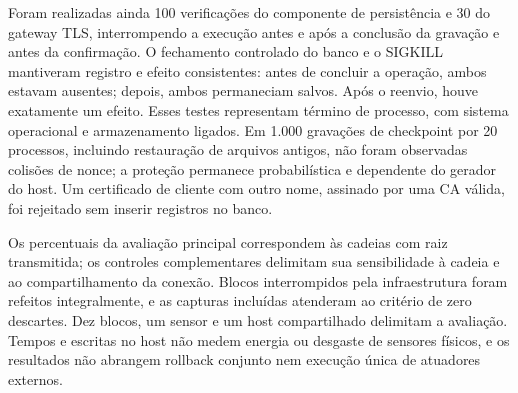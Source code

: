 Foram realizadas ainda 100 verificações do componente de persistência e 30 do gateway TLS, interrompendo a execução antes e após a conclusão da gravação e antes da confirmação. O fechamento controlado do banco e o SIGKILL mantiveram registro e efeito consistentes: antes de concluir a operação, ambos estavam ausentes; depois, ambos permaneciam salvos. Após o reenvio, houve exatamente um efeito. Esses testes representam término de processo, com sistema operacional e armazenamento ligados. Em 1.000 gravações de checkpoint por 20 processos, incluindo restauração de arquivos antigos, não foram observadas colisões de nonce; a proteção permanece probabilística e dependente do gerador do host. Um certificado de cliente com outro nome, assinado por uma CA válida, foi rejeitado sem inserir registros no banco.

Os percentuais da avaliação principal correspondem às cadeias com raiz transmitida; os controles complementares delimitam sua sensibilidade à cadeia e ao compartilhamento da conexão. Blocos interrompidos pela infraestrutura foram refeitos integralmente, e as capturas incluídas atenderam ao critério de zero descartes. Dez blocos, um sensor e um host compartilhado delimitam a avaliação. Tempos e escritas no host não medem energia ou desgaste de sensores físicos, e os resultados não abrangem rollback conjunto nem execução única de atuadores externos.

\FloatBarrier
